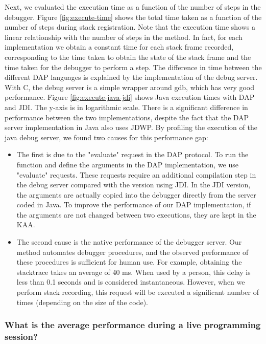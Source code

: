 \documentclass[english,submission]{programming}
\begin{document}
Next, we evaluated the execution time as a function of the number of steps in the debugger. 
Figure \ref{fig:execute-time} shows the total time taken as a function of the number of steps during stack registration.
Note that the execution time shows a linear relationship with the number of steps in the method. 
In fact, for each implementation we obtain a constant time for each stack frame recorded, corresponding to the time taken to obtain the state of the stack frame and the time taken for the debugger to perform a step. 
The difference in time between the different DAP languages is explained by the implementation of the debug server. 
With C, the debug server is a simple wrapper around gdb, which has very good performance.
Figure \ref{fig:execute-java-jdi} shows Java execution times with DAP and JDI. 
The y-axis is in logarithmic scale. 
There is a significant difference in performance between the two implementations, despite the fact that the DAP server implementation in Java also uses JDWP.
By profiling the execution of the java debug server, we found two causes for this performance gap:
\begin{itemize}
  \item The first is due to the "evaluate" request in the DAP protocol. To run the function and define the arguments in the DAP implementation, we use "evaluate" requests. These requests require an additional compilation step in the debug server compared with the version using JDI. In the JDI version, the arguments are actually copied into the debugger directly from the server coded in Java. To improve the performance of our DAP implementation, if the arguments are not changed between two executions, they are kept in the KAA.
  \item The second cause is the native performance of the debugger server. Our method automates debugger procedures, and the observed performance of these procedures is sufficient for human use. For example, obtaining the stacktrace takes an average of 40 ms. When used by a person, this delay is less than 0.1 seconds and is considered instantaneous. However, when we perform stack recording, this request will be executed a significant number of times (depending on the size of the code).
\end{itemize}

\subsubsection{What is the average performance during a live programming session?}
\end{document}
